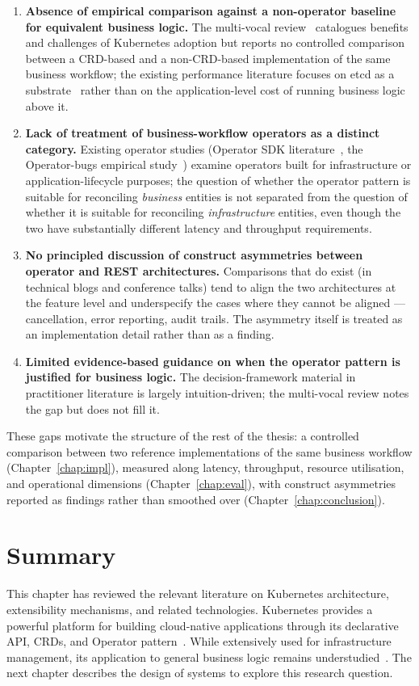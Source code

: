 \begin{enumerate}
    \item \textbf{Absence of empirical comparison against a non-operator baseline for equivalent business logic.} The multi-vocal review~\cite{kubernetes_multivocal_review} catalogues benefits and challenges of Kubernetes adoption but reports no controlled comparison between a CRD-based and a non-CRD-based implementation of the same business workflow; the existing performance literature focuses on etcd as a substrate~\cite{etcd_impact} rather than on the application-level cost of running business logic above it.
    \item \textbf{Lack of treatment of business-workflow operators as a distinct category.} Existing operator studies (Operator SDK literature~\cite{openshift_operators_lifecycle}, the Operator-bugs empirical study~\cite{operator_bugs}) examine operators built for infrastructure or application-lifecycle purposes; the question of whether the operator pattern is suitable for reconciling \emph{business} entities is not separated from the question of whether it is suitable for reconciling \emph{infrastructure} entities, even though the two have substantially different latency and throughput requirements.
    \item \textbf{No principled discussion of construct asymmetries between operator and REST architectures.} Comparisons that do exist (in technical blogs and conference talks) tend to align the two architectures at the feature level and underspecify the cases where they cannot be aligned --- cancellation, error reporting, audit trails. The asymmetry itself is treated as an implementation detail rather than as a finding.
    \item \textbf{Limited evidence-based guidance on when the operator pattern is justified for business logic.} The decision-framework material in practitioner literature is largely intuition-driven; the multi-vocal review notes the gap but does not fill it.
\end{enumerate}

These gaps motivate the structure of the rest of the thesis: a controlled comparison between two reference implementations of the same business workflow (Chapter~\ref{chap:impl}), measured along latency, throughput, resource utilisation, and operational dimensions (Chapter~\ref{chap:eval}), with construct asymmetries reported as findings rather than smoothed over (Chapter~\ref{chap:conclusion}).

\section{Summary}

This chapter has reviewed the relevant literature on Kubernetes architecture, extensibility mechanisms, and related technologies. Kubernetes provides a powerful platform for building cloud-native applications through its declarative API, CRDs, and Operator pattern~\cite{luksa2017, hightower2017, dobies2020}. While extensively used for infrastructure management, its application to general business logic remains understudied~\cite{kubernetes_multivocal_review}. The next chapter describes the design of systems to explore this research question.
